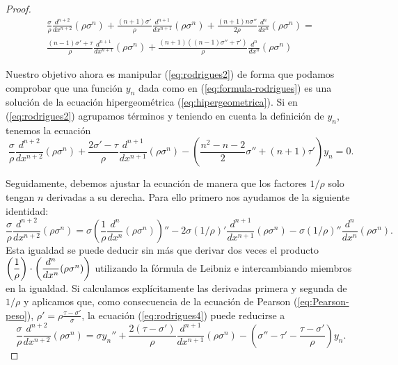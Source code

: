 \begin{proof}
    \begin{multline}
        \label{eq:rodrigues2}
        \frac{\sigma}{\rho} \frac{d^{n+2}}{d x^{n+2}} \left(\rho\sigma^n\right) + \frac{(n+1)\sigma'}{\rho}\frac{d^{n+1}}{d x^{n+1}} \left(\rho\sigma^n \right) + \frac{(n+1)n\sigma''}{2\rho}\frac{d^{n}}{d x^{n}} \left(\rho\sigma^n \right) =\\  \frac{(n-1)\sigma'+\tau}{\rho}\frac{d^{n+1}}{d x^{n+1}}\left(\rho\sigma^n \right) + \frac{(n+1)\left((n-1)\sigma'' + \tau'\right)}{\rho}\frac{d^{n}}{d x^{n}}\left(\rho\sigma^n \right)
    \end{multline}
    
    Nuestro objetivo ahora es manipular (\ref{eq:rodrigues2}) de forma que podamos comprobar que una función $y_n$ dada como en (\ref{eq:formula-rodrigues}) es una solución de la ecuación hipergeométrica (\ref{eq:hipergeometrica}). Si en (\ref{eq:rodrigues2}) agrupamos términos y teniendo en cuenta la definición de $y_n$, tenemos la ecuación
    \begin{equation}
        \label{eq:rodrigues3}
        \frac{\sigma}{\rho} \frac{d^{n+2}}{d x^{n+2}} \left(\rho\sigma^n\right) + \frac{2\sigma'-\tau}{\rho} \frac{d^{n+1}}{d x^{n+1}} \left(\rho\sigma^n \right) - \left(\frac{n^2-n-2}{2}\sigma'' + (n+1)\tau'\right)y_n =0.
    \end{equation}

    Seguidamente, debemos ajustar la ecuación de manera que los factores $1/\rho$ solo tengan $n$ derivadas a su derecha. Para ello primero nos ayudamos de la siguiente identidad:
    \begin{equation}
        \label{eq:rodrigues4}
        \frac{\sigma}{\rho} \frac{d^{n+2}}{d x^{n+2}} \left(\rho\sigma^n\right) = \sigma \left(\dfrac 1 {\rho} \dfrac{d^n}{dx^n} (\rho\sigma^n)\right)'' - 2\sigma (1/\rho)' \frac{d^{n+1}}{d x^{n+1}} \left(\rho\sigma^n \right) -\sigma (1/\rho)'' \dfrac{d^n}{dx^n} (\rho\sigma^n).
    \end{equation}
    Esta igualdad se puede deducir sin más que derivar dos veces el producto $\left(\dfrac 1 {\rho}\right)\cdot\nolinebreak\left(\dfrac{d^n}{dx^n} (\rho\sigma^n)\right)$ utilizando la fórmula de Leibniz e intercambiando miembros en la igualdad. Si calculamos explícitamente las derivadas primera y segunda de $1/\rho$ y aplicamos que, como consecuencia de la ecuación de Pearson (\ref{eq:Pearson-peso}), $\rho' = \rho\frac{\tau-\sigma'}{\sigma}$, la ecuación (\ref{eq:rodrigues4}) puede reducirse a 
    \begin{equation}
        \label{eq:rodrigues5}
        \frac{\sigma}{\rho} \frac{d^{n+2}}{d x^{n+2}} \left(\rho\sigma^n\right) = \sigma y_n'' + \frac{2(\tau-\sigma')}\rho\frac{d^{n+1}}{d x^{n+1}} \left(\rho\sigma^n \right) - \left(\sigma'' - \tau' - \dfrac{\tau-\sigma'}\rho\right)y_n.
    \end{equation}


\end{proof}
